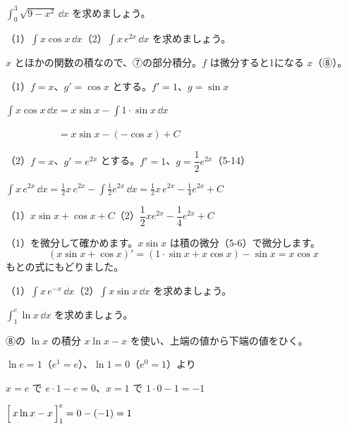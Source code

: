 \begin{jibun}
$\displaystyle\int_0^3\sqrt{9-x^2}\,\dd x$ を求めましょう。
\end{jibun}

\begin{reidai}[部分積分]
（1）$\displaystyle\int x\cos x\,\dd x$\quad（2）$\displaystyle\int x\,e^{2x}\,\dd x$ を求めましょう。\par
\kangaekata $x$ とほかの関数の積なので、⑦の部分積分。$f$ は微分すると1になる $x$（⑧）。\par
\shiki（1）$f=x$、$g'=\cos x$ とする。$f'=1$、$g=\sin x$\par
\hspace*{4.6\zw}$\displaystyle\int x\cos x\,\dd x=x\sin x-\int1\cdot\sin x\,\dd x$\par
\hspace*{4.6\zw}$\displaystyle\phantom{\int x\cos x\,\dd x}=x\sin x-(-\cos x)+C$\par
\hspace*{2.6\zw}（2）$f=x$、$g'=e^{2x}$ とする。$f'=1$、$g=\dfrac{1}{2}e^{2x}$（5-14）\par
\hspace*{4.6\zw}$\displaystyle\int x\,e^{2x}\,\dd x=\frac{1}{2}x\,e^{2x}-\int\frac{1}{2}e^{2x}\,\dd x=\frac{1}{2}x\,e^{2x}-\frac{1}{4}e^{2x}+C$\par
\kotae （1）$x\sin x+\cos x+C$\quad（2）$\dfrac{1}{2}xe^{2x}-\dfrac{1}{4}e^{2x}+C$
\end{reidai}
（1）を微分して確かめます。$x\sin x$ は積の微分（5-6）で微分します。
\[ (x\sin x+\cos x)'=(1\cdot\sin x+x\cos x)-\sin x=x\cos x \]
もとの式にもどりました。

\begin{jibun}
（1）$\displaystyle\int x\,e^{-x}\,\dd x$\quad（2）$\displaystyle\int x\sin x\,\dd x$ を求めましょう。
\end{jibun}

\begin{reidai}[$\ln x$ の積分]
$\displaystyle\int_1^e\ln x\,\dd x$ を求めましょう。\par
\kangaekata ⑧の $\ln x$ の積分 $x\ln x-x$ を使い、上端の値から下端の値をひく。\par
\shiki $\ln e=1$（$e^1=e$）、$\ln1=0$（$e^0=1$）より\par
\hspace*{2.6\zw}$x=e$ で $e\cdot1-e=0$、$x=1$ で $1\cdot0-1=-1$\par
\hspace*{2.6\zw}$\Bigl[\,x\ln x-x\,\Bigr]_1^e=0-(-1)=1$\par
{}
\end{reidai}

